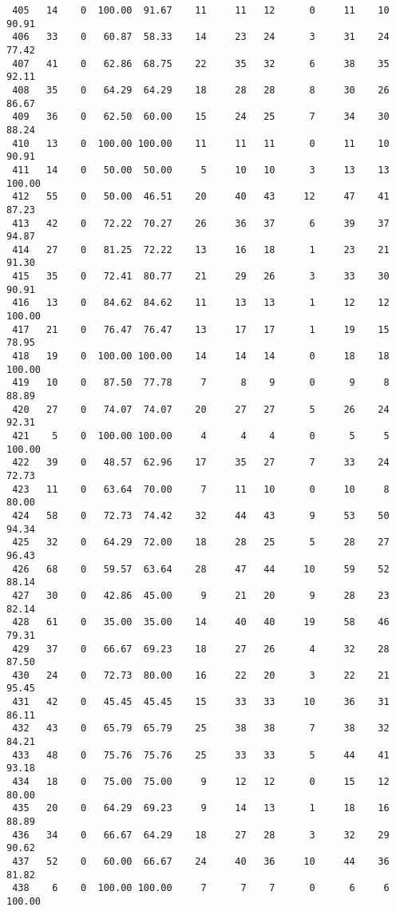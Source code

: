 \begin{verbatim}
 405   14    0  100.00  91.67    11     11   12      0     11    10    90.91
 406   33    0   60.87  58.33    14     23   24      3     31    24    77.42
 407   41    0   62.86  68.75    22     35   32      6     38    35    92.11
 408   35    0   64.29  64.29    18     28   28      8     30    26    86.67
 409   36    0   62.50  60.00    15     24   25      7     34    30    88.24
 410   13    0  100.00 100.00    11     11   11      0     11    10    90.91
 411   14    0   50.00  50.00     5     10   10      3     13    13   100.00
 412   55    0   50.00  46.51    20     40   43     12     47    41    87.23
 413   42    0   72.22  70.27    26     36   37      6     39    37    94.87
 414   27    0   81.25  72.22    13     16   18      1     23    21    91.30
 415   35    0   72.41  80.77    21     29   26      3     33    30    90.91
 416   13    0   84.62  84.62    11     13   13      1     12    12   100.00
 417   21    0   76.47  76.47    13     17   17      1     19    15    78.95
 418   19    0  100.00 100.00    14     14   14      0     18    18   100.00
 419   10    0   87.50  77.78     7      8    9      0      9     8    88.89
 420   27    0   74.07  74.07    20     27   27      5     26    24    92.31
 421    5    0  100.00 100.00     4      4    4      0      5     5   100.00
 422   39    0   48.57  62.96    17     35   27      7     33    24    72.73
 423   11    0   63.64  70.00     7     11   10      0     10     8    80.00
 424   58    0   72.73  74.42    32     44   43      9     53    50    94.34
 425   32    0   64.29  72.00    18     28   25      5     28    27    96.43
 426   68    0   59.57  63.64    28     47   44     10     59    52    88.14
 427   30    0   42.86  45.00     9     21   20      9     28    23    82.14
 428   61    0   35.00  35.00    14     40   40     19     58    46    79.31
 429   37    0   66.67  69.23    18     27   26      4     32    28    87.50
 430   24    0   72.73  80.00    16     22   20      3     22    21    95.45
 431   42    0   45.45  45.45    15     33   33     10     36    31    86.11
 432   43    0   65.79  65.79    25     38   38      7     38    32    84.21
 433   48    0   75.76  75.76    25     33   33      5     44    41    93.18
 434   18    0   75.00  75.00     9     12   12      0     15    12    80.00
 435   20    0   64.29  69.23     9     14   13      1     18    16    88.89
 436   34    0   66.67  64.29    18     27   28      3     32    29    90.62
 437   52    0   60.00  66.67    24     40   36     10     44    36    81.82
 438    6    0  100.00 100.00     7      7    7      0      6     6   100.00

\end{verbatim}
